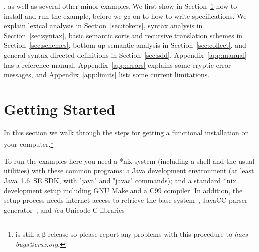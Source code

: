 \documentclass[11pt]{article} %
\begin{document}
\cite[Figure~1.7]{Aho+:2006}, as well as several other minor examples. %
We first show in Section~\ref{sec:run} how to install \HAX and run the example, before we go on to
how to write specifications. %
We explain lexical analysis in Section~\ref{sec:tokens}, %
syntax analysis in Section~\ref{sec:syntax}, %
basic semantic sorts and recursive translation schemes in Section~\ref{sec:schemes}, %
bottom-up semantic analysis in Section~\ref{sec:collect}. %
and general syntax-directed definitions in Section~\ref{sec:sdd}, %
Appendix~\ref{app:manual} has a reference manual, %
Appendix~\ref{app:errors} explains some cryptic error messages, %
and Appendix~\ref{app:limits} lists some current limitations.


\section{Getting Started}\label{sec:run}

In this section we walk through the steps for getting a functional \HAX installation on your
computer.\footnote{\HAX is still a β release so please report any problems with this procedure to
  \emph{hacs-bugs@crsx.org}.}

\begin{requirements}
  To run the \HAX examples here you need a *nix system (including a shell and the usual utilities)
  with these common programs: a Java development environment (at least Java~1.6~SE SDK, with "java"
  and "javac" commands); and a standard *nix development setup including GNU Make and a C99
  compiler. In addition, the setup process needs internet access to retrieve the \CRSX base
  system~\cite{crsx}, JavaCC parser generator~\cite{JavaCC}, and \emph{icu} Unicode C
  libraries~\cite{ICU}.
\end{requirements}
\end{document}
